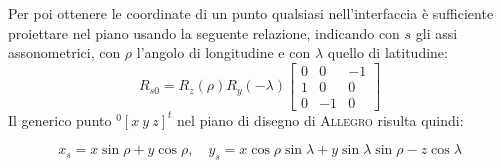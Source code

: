 Per poi ottenere le coordinate di un punto qualsiasi  nell'interfaccia \`e sufficiente proiettare nel piano usando la seguente relazione, indicando con $s$ gli assi assonometrici, con $\rho$ l'angolo di longitudine e con $\lambda$ quello di latitudine:
\begin{equation}
	R_{s0} = R_z (\rho)  R_y (-\lambda)  \begin{bmatrix}
	0 & 0 & -1\\
	1 & 0 & 0\\
	0 & -1 & 0
	\end{bmatrix}
\label{eq:proiezione}
\end{equation}
Il generico punto $^0\!\left[ x \ y \ z \right]^t $ nel piano di disegno di \textsc{Allegro} risulta quindi:

\begin{equation}
	x_{s} = x\sin\rho + y\cos\rho, \quad y_{s} = x \cos \rho \sin \lambda + y \sin \lambda \sin \rho - z \cos \lambda
\end{equation}